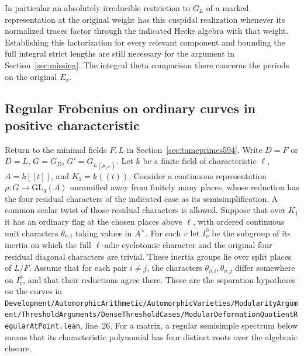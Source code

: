\documentclass[a4paper,11pt]{article}
\theoremstyle{definition}
\theoremstyle{remark}
\newcommand{\srcloc}[2]{{\small\nolinkurl{#1.lean}}, line~#2}
\numberwithin{equation}{section}
\begin{document}
In particular an absolutely irreducible restriction to
\(G_L\) of a marked representation at the original weight
has this cuspidal realization whenever its normalized
traces factor through the indicated Hecke algebra with
that weight. Establishing this factorization for every
relevant component and bounding the full integral strict
lengths are still necessary for the argument in
Section~\ref{sec:missing}. The integral theta comparison
there concerns the periods on the original \(E_x\).


\subsection{Regular Frobenius on ordinary curves in positive characteristic}
\label{sec:regularcurves597}

Return to the minimal fields \(F,L\) in
Section~\ref{sec:tameprimes594}. Write \(D=F\) or \(D=L\),
\(G=G_D\), \(G'=G_{L(\mu_{\ell^\infty})}\). Let \(k\) be a
finite field of characteristic \(\ell\), \(A=k[[t]]\), and
\(K_1=k((t))\). Consider a continuous representation
\(\rho:G\to\mathrm{GL}_4(A)\) unramified away from finitely
many places, whose reduction has the four residual
characters of the indicated case as its semisimplification.
A common scalar twist of those residual characters is
allowed. Suppose that over \(K_1\) it has an ordinary flag
at the chosen places above \(\ell\), with ordered continuous
unit characters \(\theta_{v,i}\) taking values in \(A^\times\).
For each \(v\) let \(I_v^0\) be the subgroup of its inertia
on which the full \(\ell\)-adic cyclotomic character and
the original four residual diagonal characters are trivial.
These inertia groups lie over split places of \(L/F\).
Assume that for each pair \(i\ne j\), the characters
\(\theta_{v,i},\theta_{v,j}\) differ somewhere on \(I_v^0\),
and that their reductions agree there. These are the
separation hypotheses on the curves in
\srcloc{Development/AutomorphicArithmetic/AutomorphicVarieties/ModularityArgument/ThresholdArguments/DenseThresholdCases/ModularDeformationQuotientRegularAtPoint}{26}.
For a matrix, a regular semisimple spectrum below means
that its characteristic polynomial has four distinct roots
over the algebraic closure.
\end{document}
